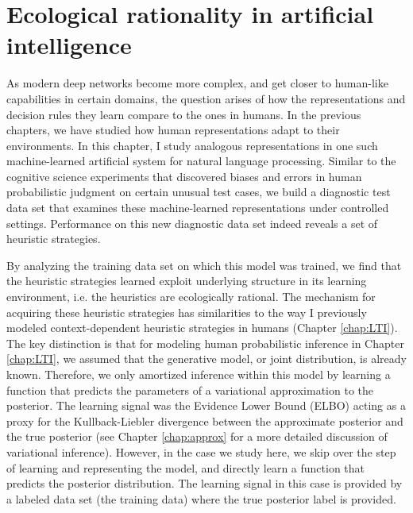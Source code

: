 \chapter{Ecological rationality in artificial intelligence}
\label{chap:sentences}

As modern deep networks become more complex, and get closer to human-like capabilities in certain domains, the question arises of how the representations and decision rules they learn compare to the ones in humans. In the previous chapters, we have studied how human representations adapt to their environments. In this chapter, I study analogous representations in one such machine-learned artificial system for natural language processing. Similar to the cognitive science experiments that discovered biases and errors in human probabilistic judgment on certain unusual test cases\cite{tversky, fox1998belief, gigerenzer2011heuristic}, we build a diagnostic test data set that examines these machine-learned representations under controlled settings. Performance on this new diagnostic data set indeed reveals a set of heuristic strategies. 

By analyzing the training data set on which this model was trained, we find that the heuristic strategies learned exploit underlying structure in its learning environment, i.e. the heuristics are ecologically rational. The mechanism for acquiring these heuristic strategies has similarities to the way I previously modeled context-dependent heuristic strategies in humans (Chapter \ref{chap:LTI}). The key distinction is that for modeling human probabilistic inference in Chapter \ref{chap:LTI}, we assumed that the generative model, or joint distribution, is already known. Therefore, we only amortized inference within this model by learning a function that predicts the parameters of a variational approximation to the posterior. The learning signal was the Evidence Lower Bound (ELBO) acting as a proxy for the Kullback-Liebler divergence between the approximate posterior and the true posterior (see Chapter \ref{chap:approx} for a more detailed discussion of variational inference). However, in the case we study here, we skip over the step of learning and representing the model, and directly learn a function that predicts the posterior distribution. The learning signal in this case is provided by a labeled data set (the training data) where the true posterior label is provided.

